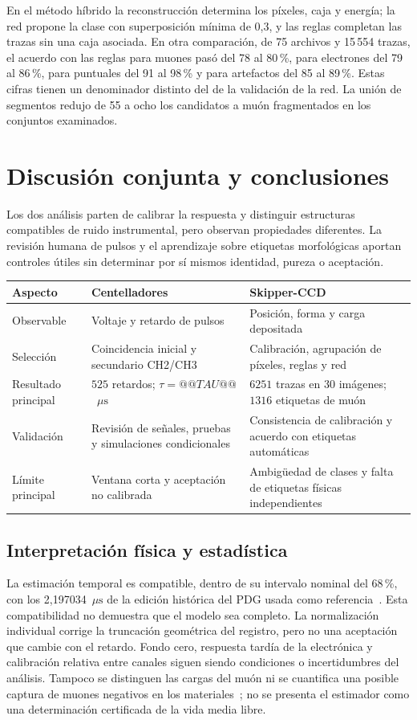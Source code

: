 \documentclass[10pt,a4paper]{article}
\newcommand{\us}{\ensuremath{\mu\mathrm{s}}}
\begin{document}
En el método híbrido la reconstrucción determina los píxeles, caja y energía; la red propone la clase con superposición mínima de 0{,}3, y las reglas completan las trazas sin una caja asociada. En otra comparación, de 75 archivos y 15\,554 trazas, el acuerdo con las reglas para muones pasó del 78 al 80\,\%, para electrones del 79 al 86\,\%, para puntuales del 91 al 98\,\% y para artefactos del 85 al 89\,\%. Estas cifras tienen un denominador distinto del de la validación de la red. La unión de segmentos redujo de 55 a ocho los candidatos a muón fragmentados en los conjuntos examinados.

\newpage
\section{Discusión conjunta y conclusiones}
Los dos análisis parten de calibrar la respuesta y distinguir estructuras compatibles de ruido instrumental, pero observan propiedades diferentes. La revisión humana de pulsos y el aprendizaje sobre etiquetas morfológicas aportan controles útiles sin determinar por sí mismos identidad, pureza o aceptación.
\begin{center}\small
\begin{tabularx}{\textwidth}{@{}lXX@{}}\toprule
Aspecto & Centelladores & Skipper-CCD \\\midrule
Observable & Voltaje y retardo de pulsos & Posición, forma y carga depositada \\
Selección & Coincidencia inicial y secundario CH2/CH3 & Calibración, agrupación de píxeles, reglas y red \\
Resultado principal & $525$ retardos; $\tau=@@TAU@@$~\us & $6251$ trazas en 30 imágenes; $1316$ etiquetas de muón \\
Validación & Revisión de señales, pruebas y simulaciones condicionales & Consistencia de calibración y acuerdo con etiquetas automáticas \\
Límite principal & Ventana corta y aceptación no calibrada & Ambigüedad de clases y falta de etiquetas físicas independientes \\\bottomrule
\end{tabularx}\end{center}

\subsection*{Interpretación física y estadística}
La estimación temporal es compatible, dentro de su intervalo nominal del 68\,\%, con los 2{,}197034~\us{} de la edición histórica del PDG usada como referencia~\cite{pdg}. Esta compatibilidad no demuestra que el modelo sea completo. La normalización individual corrige la truncación geométrica del registro, pero no una aceptación que cambie con el retardo. Fondo cero, respuesta tardía de la electrónica y calibración relativa entre canales siguen siendo condiciones o incertidumbres del análisis. Tampoco se distinguen las cargas del muón ni se cuantifica una posible captura de muones negativos en los materiales~\cite{capture}; no se presenta el estimador como una determinación certificada de la vida media libre.
\end{document}
